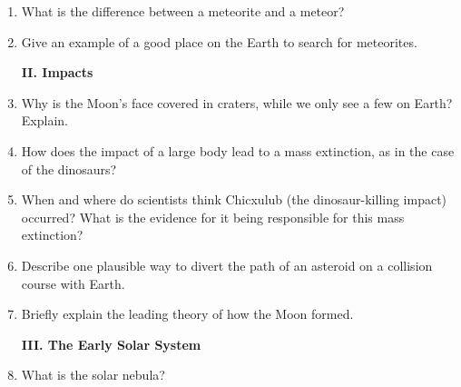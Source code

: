 \documentclass[12pt]{article}%
\begin{document}
\begin{flushleft}
\begin{enumerate}
\vspace{0.3cm}

\item What is the difference between a meteorite and a meteor? 

\vspace{0.3cm}

\item Give an example of a good place on the Earth to search for meteorites.

\vspace{0.3cm}

\begin{center}
\textbf{II. Impacts}
\end{center}

\item Why is the Moon's face covered in craters, while we only see a few on Earth? 
Explain.

\vspace{0.3cm}

\item How does the impact of a large body lead to a mass extinction, as in the
case of the dinosaurs?  

\vspace{0.3cm}

\item When and where do scientists think Chicxulub (the dinosaur-killing impact) 
occurred?  What is the evidence for it being responsible for this mass
extinction?

\vspace{0.3cm}

\item Describe one plausible way to divert the path of an asteroid on a collision
course with Earth.

\vspace{0.3cm}

\item Briefly explain the leading theory of how the Moon formed. 

\vspace{0.3cm}


\begin{center}
\textbf{III. The Early Solar System}
\end{center}

\item What is the solar nebula? 

\vspace{0.3cm}


\end{enumerate}
\end{flushleft}
\end{document}
